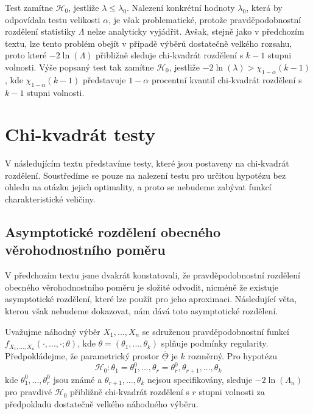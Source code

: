 Test zamítne $\mathscr{H}_0$, jestliže $\lambda \le \lambda_0$. Nalezení konkrétní hodnoty $\lambda_0$, která by odpovídala testu velikosti $\alpha$, je však problematické, protože pravděpodobnostní rozdělení statistiky $\Lambda$ nelze analyticky vyjádřit. Avšak, stejně jako v předchozím textu, lze tento problém obejít v případě výběrů dostatečně velkého rozsahu, proto které $-2 \ln(\Lambda)$ přibližně sleduje chi-kvadrát rozdělení s $k - 1$ stupni volnosti. Výše popsaný test tak zamítne $\mathscr{H_0}$, jestliže $-2 \ln(\lambda) > \chi_{1 - \alpha}(k - 1)$, kde $\chi_{1 - \alpha}(k - 1)$ představuje $1 - \alpha$ procentní kvantil chi-kvadrát rozdělení s $k - 1$ stupni volnosti.

\section{Chi-kvadrát testy}

V následujícím textu představíme testy, které jsou postaveny na chi-kvadrát rozdělení. Soustředíme se pouze na nalezení testu pro určitou hypotézu bez ohledu na otázku jejich optimality, a proto se nebudeme zabývat funkcí charakteristické veličiny.

\subsection{Asymptotické rozdělení obecného věrohodnostního poměru}

V předchozím textu jsme dvakrát konstatovali, že pravděpodobnostní rozdělení obecného věrohodnostního poměru je složité odvodit, nicméně že existuje asymptotické rozdělení, které lze použít pro jeho aproximaci. Následující věta, kterou však nebudeme dokazovat, nám dává toto asymptotické rozdělení.

\begin{theorem}
Uvažujme náhodný výběr $X_1, ..., X_n$ se sdruženou pravděpodobnostní funkcí $f_{X_1, ..., X_n}(\cdot, ..., \cdot; \theta)$, kde $\theta = (\theta_1, ..., \theta_k)$ splňuje podmínky regularity. Předpokládejme, že parametrický prostor $\overline{\underline{\Theta}}$ je $k$ rozměrný. Pro hypotézu
\begin{equation*}
\mathscr{H}_0: \theta_1 = \theta_1^0, ..., \theta_r = \theta_r^0, \theta_{r + 1}, ..., \theta_k
\end{equation*}
kde $\theta_1^0, ..., \theta_r^0$ jsou známé a $\theta_{r + 1}, ..., \theta_k$ nejsou specifikovány, sleduje $-2 \ln(\Lambda_n)$ pro pravdivé $\mathscr{H}_0$ přibližně chi-kvadrát rozdělení s $r$ stupni volnosti za předpokladu dostatečně velkého náhodného výběru.
\end{theorem}

